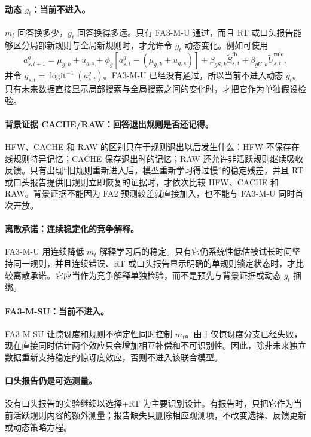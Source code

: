\paragraph{动态 $g_t$：当前不进入。}
$m_t$ 回答换多少，$g_t$ 回答换得多远。只有 FA3-M-U 通过，而且 RT 或口头报告能够区分局部新规则与全局新规则时，才允许令 $g_t$ 动态变化。例如可使用
\begin{equation}
a^g_{s,t+1}
=\mu_{g,k}+u_{g,s}
+\phi_g[a^g_{s,t}-(\mu_{g,k}+u_{g,s})]
+\beta_{gS,k}\widetilde S^{\mathrm{fb}}_{s,t}
+\beta_{gU,k}\widetilde U^{\mathrm{rule}}_{s,t},
\label{eq:model0806-dynamic-g}
\end{equation}
并令 $g_{s,t}=\operatorname{logit}^{-1}(a^g_{s,t})$。FA3-M-U 已经没有通过，所以当前不进入动态 $g_t$。只有未来数据直接显示局部搜索与全局搜索之间的变化时，才把它作为单独假设检验。

\paragraph{背景证据 CACHE/RAW：回答退出规则是否还记得。}
HFW、CACHE 和 RAW 的区别只在于规则退出以后发生什么：HFW 不保存在线规则特异记忆；CACHE 保存退出时的记忆；RAW 还允许非活跃规则继续吸收反馈。只有出现“旧规则重新进入后，模型重新学习得过慢”的稳定残差，并且 RT 或口头报告提供旧规则立即恢复的证据时，才依次比较 HFW、CACHE 和 RAW。背景证据不能因为 FA2 预测较差就直接加入，也不能与 FA3-M-U 同时首次开放。

\paragraph{离散承诺：连续稳定化的竞争解释。}
FA3-M-U 用连续降低 $m_t$ 解释学习后的稳定。只有它仍系统性低估被试长时间坚持同一规则，并且连续错误、RT 或口头报告显示明确的单规则锁定状态时，才比较离散承诺。它应当作为竞争解释单独检验，而不是预先与背景证据或动态 $g_t$ 捆绑。

\paragraph{FA3-M-SU：当前不进入。}
FA3-M-SU 让惊讶度和规则不确定性同时控制 $m_t$。由于仅惊讶度分支已经失败，现在直接同时估计两个效应只会增加相互补偿和不可识别性。因此，除非未来独立数据重新支持稳定的惊讶度效应，否则不进入该联合模型。

\paragraph{口头报告仍是可选测量。}
没有口头报告的实验继续以选择+RT 为主要识别设计。有报告时，只把它作为当前活跃规则内容的额外测量；报告缺失只删除相应观测项，不改变选择、反馈更新或动态策略方程。


